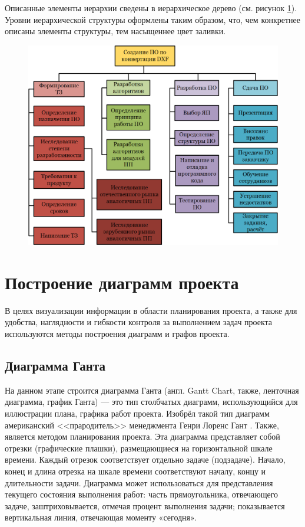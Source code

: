 Описанные элементы иерархии сведены в иерархическое дерево (см. рисунок \ref{fig:projektaufgaben}). Уровни иерархической структуры оформлены таким образом, что, чем конкретнее описаны элементы структуры, тем насыщеннее цвет заливки.

	
\begin{figure}[H]
	\centering
	\includegraphics[width=1.0\textwidth]{figures/projektaufgaben.png}
	\label{fig:projektaufgaben}
\end{figure}

\section{Построение диаграмм проекта}

В целях визуализации информации в области планирования проекта, а также для удобства, наглядности и гибкости контроля за выполнением задач проекта используются методы построения диаграмм и графов проекта.

\subsection{Диаграмма Ганта}

На данном этапе строится диаграмма Ганта (англ. Gantt Chart, также, ленточная диаграмма, график Ганта) --- это тип столбчатых диаграмм, использующийся для иллюстрации плана, графика работ проекта. Изобрёл такой тип диаграмм американский <<прародитель>> менеджмента Генри Лоренс Гант \cite{gantt}. Также, является методом планирования проекта. Эта диаграмма представляет собой отрезки (графические плашки), размещающиеся на горизонтальной шкале времени. Каждый отрезок соответствует отдельно задаче (подзадаче). Начало, конец и длина отрезка на шкале времени соответствуют началу, концу и длительности задачи. Диаграмма может использоваться для представления текущего состояния выполнения работ: часть прямоугольника, отвечающего задаче, заштриховывается, отмечая процент выполнения задачи; показывается вертикальная линия, отвечающая моменту «сегодня».

